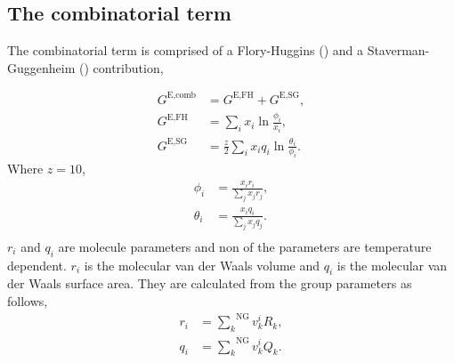 \documentclass[english]{../thermomemo/thermomemo}
\newcommand*{\ousum}[2]{\overset{#1}{\underset{#2}{\sum}}}
\newcommand{\excess}{\text{E}\xspace}
\newcommand{\comb}{\text{comb}\xspace}
\newcommand{\FH}{\text{FH}\xspace}
\newcommand{\SG}{\text{SG}\xspace}
\newcommand{\NGr}{\text{NG}\xspace}
\begin{document}
\subsection{The combinatorial term}
The combinatorial term is comprised of a Flory-Huggins (\FH) and a
Staverman-Guggenheim (\SG) contribution,

\begin{align}
  G^{\excess,\comb} &= G^{\excess,\FH} + G^{\excess,\SG},\label{eq:comb}\\
  G^{\excess,\FH} &= \underset{i}{\sum} x_i \ln \frac{\phi_i}{x_i}, \label{eq:fh}\\
  G^{\excess,\SG} &= \frac{z}{2} \underset{i}{\sum} x_i q_i \ln \frac{\theta_i}{\phi_i}\label{eq:sg}.
\end{align}
Where $z=10$,
\begin{align}
  \phi_i &= \frac{x_i r_i}{\underset{j}{\sum} x_j r_j},\label{eq:phii}\\
  \theta_i &= \frac{x_i q_i}{\underset{j}{\sum} x_j q_j}.\label{eq:thetai}\\
\end{align}
$r_i$ and $q_i$ are molecule parameters and non of the parameters are temperature dependent. $r_i$ is the molecular van der Waals volume and $q_i$ is the molecular van der Waals surface area. They are calculated from the group parameters as follows,
\begin{align}
  r_i &= \ousum{\NGr}{k}v_k^i R_k,\label{eq:ri}\\
  q_i &= \ousum{\NGr}{k}v_k^i Q_k.\label{eq:qi}\\
\end{align}
\end{document}
